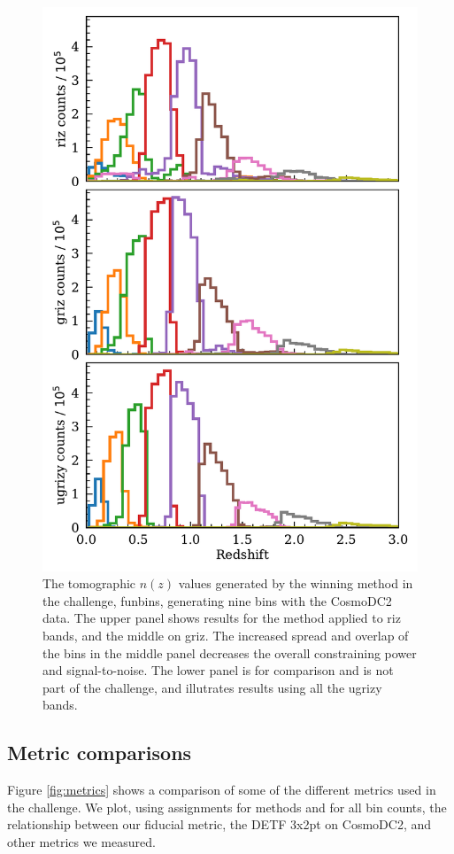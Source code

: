 \documentclass[twocolumn,twocolappendix]{aastex63}
\begin{document}
\begin{figure}[htbp]
\includegraphics[width=1\linewidth]{results/funbins_nz.pdf}
\caption{The tomographic $n(z)$ values generated by the winning method in the challenge, {\sc funbins},
generating nine bins with the CosmoDC2 data.
The upper panel shows results for the method applied to riz bands, and the middle on griz. The
increased spread and overlap of the bins in the middle panel decreases the overall constraining
power and signal-to-noise.  The lower panel is for comparison and is not part of the challenge,
and illutrates results using all the ugrizy bands.}
\label{fig:funbin_nz}
\end{figure}



\subsection{Metric comparisons} \label{sec:metric-results}
Figure \ref{fig:metrics} shows a comparison of some of the different metrics used in the challenge.
We plot, using assignments for methods and for all bin counts, the relationship between our fiducial
metric, the DETF 3x2pt on CosmoDC2, and other metrics we measured.
\end{document}
